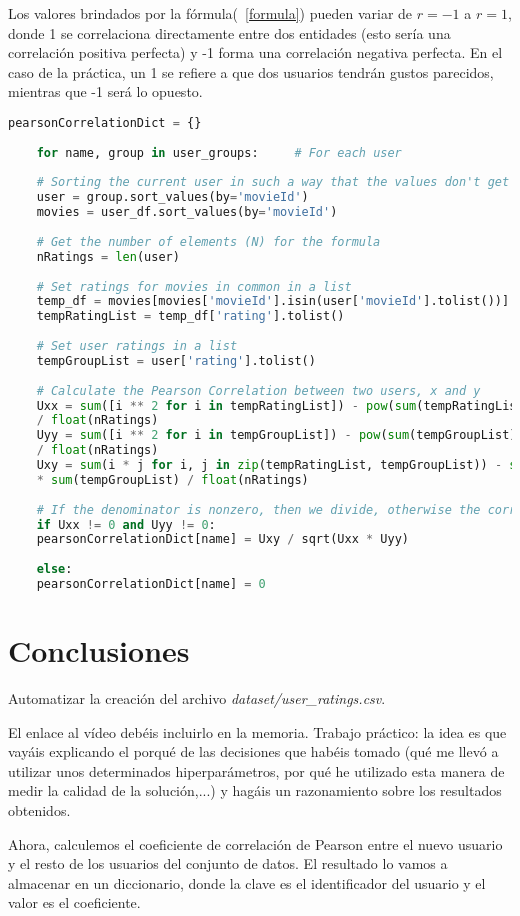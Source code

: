 \documentclass{uimppracticas}
\begin{document}
Los valores brindados por la fórmula(~\ref{formula}) pueden variar de $r=-1$ a $r=1$, donde 1 se correlaciona directamente entre dos entidades (esto sería una correlación positiva perfecta) y -1 forma una correlación negativa perfecta. En el caso de la práctica, un 1 se refiere a que dos usuarios tendrán gustos parecidos, mientras que -1 será lo opuesto.

\begin{lstlisting}[language=python]
	pearsonCorrelationDict = {}
	
	for name, group in user_groups:     # For each user
	
	# Sorting the current user in such a way that the values don't get mixed up later
	user = group.sort_values(by='movieId')
	movies = user_df.sort_values(by='movieId')
	
	# Get the number of elements (N) for the formula
	nRatings = len(user)
	
	# Set ratings for movies in common in a list
	temp_df = movies[movies['movieId'].isin(user['movieId'].tolist())]
	tempRatingList = temp_df['rating'].tolist()
	
	# Set user ratings in a list
	tempGroupList = user['rating'].tolist()
	
	# Calculate the Pearson Correlation between two users, x and y
	Uxx = sum([i ** 2 for i in tempRatingList]) - pow(sum(tempRatingList), 2) 
	/ float(nRatings)
	Uyy = sum([i ** 2 for i in tempGroupList]) - pow(sum(tempGroupList), 2) 
	/ float(nRatings)
	Uxy = sum(i * j for i, j in zip(tempRatingList, tempGroupList)) - sum(tempRatingList)  
	* sum(tempGroupList) / float(nRatings)
	
	# If the denominator is nonzero, then we divide, otherwise the correlation is 0
	if Uxx != 0 and Uyy != 0:
	pearsonCorrelationDict[name] = Uxy / sqrt(Uxx * Uyy)
	
	else:
	pearsonCorrelationDict[name] = 0
\end{lstlisting}

\newpage

\section{Conclusiones}

Automatizar la creación del archivo \textit{dataset/user\_ratings.csv}.

El enlace al vídeo debéis incluirlo en la memoria. Trabajo práctico: la idea es que vayáis explicando el porqué de las decisiones que habéis tomado (qué me llevó a utilizar unos determinados hiperparámetros, por qué he utilizado esta manera de medir la calidad de la solución,...) y hagáis un razonamiento sobre los resultados obtenidos.

Ahora, calculemos el coeficiente de correlación de Pearson entre el nuevo usuario y el resto de los usuarios del conjunto de datos. El resultado lo vamos a almacenar en un diccionario, donde la clave es el identificador del usuario y el valor es el coeficiente.


\newpage

\renewcommand{\refname}{Bibliografía}


	
\end{document}
